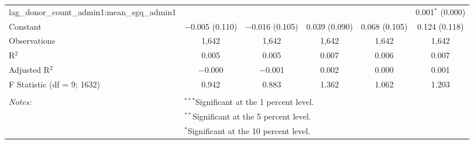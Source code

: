\begin{table}[!htbp]
\begin{tabular}{@{\extracolsep{2pt}}lccccc}
  lag\_donor\_count\_admin1:mean\_sgq\_admin1 &  &  &  &  & 0.001$^{*}$ (0.000) \\ 
  Constant & $-$0.005 (0.110) & $-$0.016 (0.105) & 0.039 (0.090) & 0.068 (0.105) & 0.124 (0.118) \\ 
 Observations & 1,642 & 1,642 & 1,642 & 1,642 & 1,642 \\ 
R$^{2}$ & 0.005 & 0.005 & 0.007 & 0.006 & 0.007 \\ 
Adjusted R$^{2}$ & $-$0.000 & $-$0.001 & 0.002 & 0.000 & 0.001 \\ 
F Statistic (df = 9; 1632) & 0.942 & 0.883 & 1.362 & 1.062 & 1.203 \\ 
\hline \\[-1.8ex] 
\textit{Notes:} & \multicolumn{5}{l}{$^{***}$Significant at the 1 percent level.} \\ 
 & \multicolumn{5}{l}{$^{**}$Significant at the 5 percent level.} \\ 
 & \multicolumn{5}{l}{$^{*}$Significant at the 10 percent level.} \\ 
\end{tabular} 
\end{table} 
